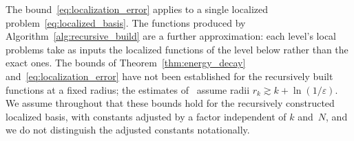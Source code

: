 \begin{remark}\label{rem:recursive_localization}
  The bound~\eqref{eq:localization_error} applies to a single
  localized problem~\eqref{eq:localized_basis}.  The functions produced by
  Algorithm~\ref{alg:recursive_build} are a further approximation: each
  level's local problems take as inputs the localized functions of the
  level below rather than the exact ones.  The bounds of
  Theorem~\ref{thm:energy_decay} and~\eqref{eq:localization_error} have not
  been established for the recursively built functions at a fixed radius;
  the estimates of~\cite[\S16.4]{Owhadi_Scovel_2019} assume radii
  $r_k \gtrsim k + \ln(1/\varepsilon)$.  We assume throughout that these bounds
  hold for the recursively constructed localized basis, with constants
  adjusted by a factor independent of $k$ and~$N$, and we do not
  distinguish the adjusted constants notationally.
\end{remark}
%
%
%
%
